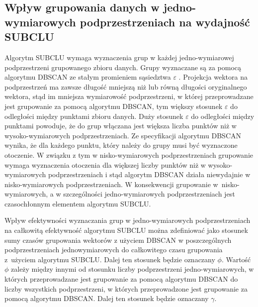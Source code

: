 \subsection*{Wpływ grupowania danych w jedno-wymiarowych podprzestrzeniach na wydajność SUBCLU}
Algorytm SUBCLU \cite{subclu} wymaga wyznaczenia grup w każdej jedno-wymiarowej podprzestrzeni grupowanego zbioru danych. Grupy wyznaczane są za pomocą algorytmu DBSCAN \cite{dbscan} ze stałym promieniem sąsiedztwa $\varepsilon$ . Projekcja wektora na podprzestrzeń ma zawsze długość mniejszą niż lub równą długości oryginalnego wektora, stąd im mniejsza wymiarowość podprzestrzeni, w której przeprowadzane jest grupowanie za pomocą algorytmu DBSCAN, tym większy stosunek $\varepsilon$ do odległości między punktami zbioru danych. Duży stosunek $\varepsilon$ do odległości między punktami powoduje, że do grup włączana jest większa liczba punktów niż w wysoko-wymiarowych podprzestrzeniach. Ze specyfikacji algorytmu DBSCAN wynika, że dla każdego punktu, który należy do grupy musi być wyznaczone otoczenie. W związku z tym w nisko-wymiarowych podprzestrzeniach grupowanie wymaga wyznaczenia otoczenia dla większej liczby punktów niż w wysoko-wymiarowych podprzestrzeniach i stąd algorytm DBSCAN działa niewydajnie w nisko-wymiarowych podprzestrzeniach. W konsekwencji grupowanie \mbox{w nisko-wymiarowych}, a w szczególności jedno-wymiarowych podprzestrzeniach jest czasochłonnym elementem algorytmu SUBCLU.\par

Wpływ efektywności wyznaczania grup w jedno-wymiarowych podprzestrzeniach na całkowitą efektywność algorytmu SUBCLU można zdefiniować jako stosunek sumy czasów grupowania wektorów z użyciem DBSCAN w poszczególnych podprzestrzeniach jednowymiarowych do całkowitego czasu grupowania \mbox{z użyciem} algorytmu SUBCLU. Dalej ten stosunek będzie oznaczany $ \phi $. Wartość $ \phi $ zależy między innymi od stosunku liczby podprzestrzeni jedno-wymiarowych, w których przeprowadzane jest grupowanie za pomocą algorytmu DBSCAN do liczby wszystkich podprzestrzeni, w których przeprowadzone jest grupowanie za pomocą algorytmu DBSCAN. Dalej ten stosunek będzie oznaczany $ \gamma $.\par

